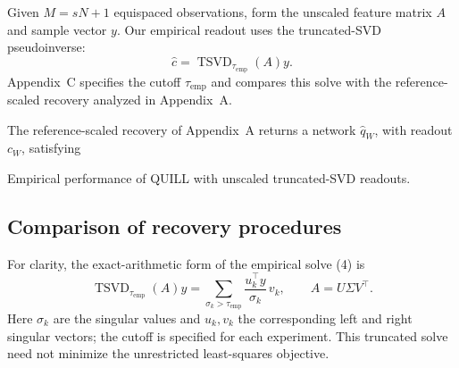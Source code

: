 
Given $M=sN+1$ equispaced observations, form the unscaled feature matrix
$A$ and sample vector $y$. Our empirical readout uses the truncated-SVD
pseudoinverse:
\begin{equation}
  \widehat c=\operatorname{TSVD}_{\tau_{\mathrm{emp}}}(A)y.
  \tag{4}
\end{equation}
Appendix~C specifies the cutoff $\tau_{\mathrm{emp}}$ and compares this
solve with the reference-scaled recovery analyzed in Appendix~A.

The reference-scaled recovery of Appendix~A returns a network
$\widehat q_W$, with readout $c_W$, satisfying

Empirical performance of QUILL with unscaled truncated-SVD readouts.

\subsection{Comparison of recovery procedures}
\label{sec:recovery_comparison}
For clarity, the exact-arithmetic form of the empirical solve (4) is
\[
 \operatorname{TSVD}_{\tau_{\mathrm{emp}}}(A)y
 =\sum_{\sigma_k>\tau_{\mathrm{emp}}}
       \frac{u_k^\top y}{\sigma_k}\,v_k,
 \qquad A=U\Sigma V^\top.
\]
Here $\sigma_k$ are the singular values and $u_k,v_k$ the corresponding
left and right singular vectors; the cutoff is specified for each experiment.
This truncated solve need not minimize the unrestricted least-squares objective.

